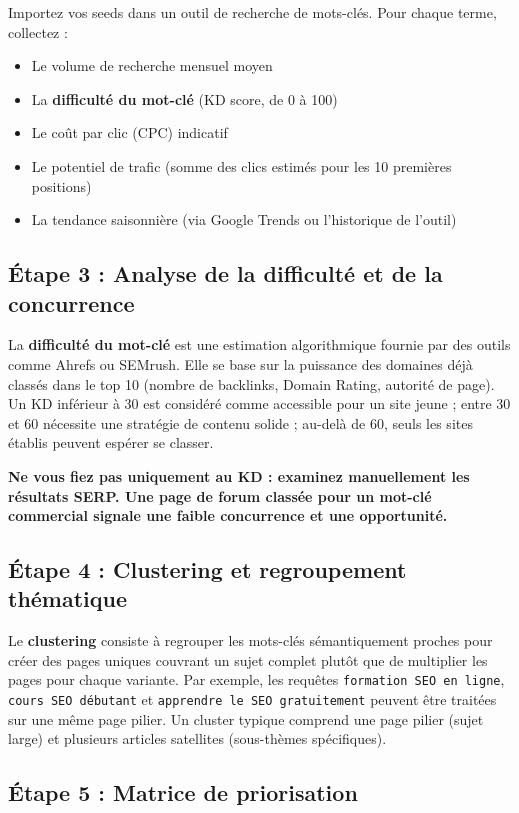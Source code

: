 \documentclass[12pt,a4paper,twoside]{report}
\newcommand{\keyword}[1]{\textbf{\textcolor{googleblue}{#1}}}
\newcommand{\important}[1]{\textbf{\textcolor{googlered}{#1}}}
\begin{document}
Importez vos seeds dans un outil de recherche de mots-clés. Pour chaque terme, collectez :

\begin{itemize}
    \item Le volume de recherche mensuel moyen
    \item La \keyword{difficulté du mot-clé} (KD score, de 0 à 100)
    \item Le coût par clic (CPC) indicatif
    \item Le potentiel de trafic (somme des clics estimés pour les 10 premières positions)
    \item La tendance saisonnière (via Google Trends ou l'historique de l'outil)
\end{itemize}

\subsection{Étape 3 : Analyse de la difficulté et de la concurrence}

La \keyword{difficulté du mot-clé} est une estimation algorithmique fournie par des outils comme Ahrefs ou SEMrush. Elle se base sur la puissance des domaines déjà classés dans le top 10 (nombre de backlinks, Domain Rating, autorité de page). Un KD inférieur à 30 est considéré comme accessible pour un site jeune ; entre 30 et 60 nécessite une stratégie de contenu solide ; au-delà de 60, seuls les sites établis peuvent espérer se classer.

\important{Ne vous fiez pas uniquement au KD : examinez manuellement les résultats SERP. Une page de forum classée pour un mot-clé commercial signale une faible concurrence et une opportunité.}

\subsection{Étape 4 : Clustering et regroupement thématique}

Le \keyword{clustering} consiste à regrouper les mots-clés sémantiquement proches pour créer des pages uniques couvrant un sujet complet plutôt que de multiplier les pages pour chaque variante. Par exemple, les requêtes \texttt{formation SEO en ligne}, \texttt{cours SEO débutant} et \texttt{apprendre le SEO gratuitement} peuvent être traitées sur une même page pilier. Un cluster typique comprend une page pilier (sujet large) et plusieurs articles satellites (sous-thèmes spécifiques).

\subsection{Étape 5 : Matrice de priorisation}
\end{document}
